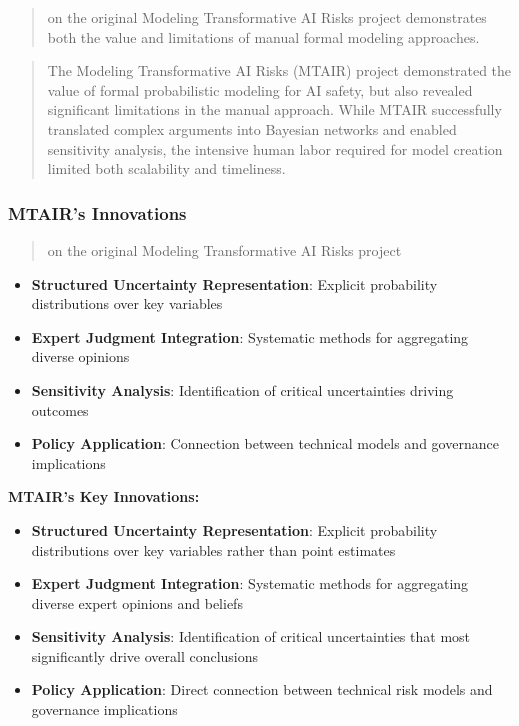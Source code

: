 \documentclass[
  11pt,
  letterpaper,
]{book}
\providecommand{\tightlist}{%
  \setlength{\itemsep}{0pt}\setlength{\parskip}{0pt}}
\begin{document}
\begin{quote}
\textcite{bucknall2022} on the original Modeling Transformative AI Risks
project demonstrates both the value and limitations of manual formal
modeling approaches.
\end{quote}

\begin{quote}
The Modeling Transformative AI Risks (MTAIR) project demonstrated the
value of formal probabilistic modeling for AI safety, but also revealed
significant limitations in the manual approach. While MTAIR successfully
translated complex arguments into Bayesian networks and enabled
sensitivity analysis, the intensive human labor required for model
creation limited both scalability and timeliness.
\end{quote}

\subsubsection{MTAIR's Innovations}\label{sec-mtair-innovations}

\begin{quote}
\textcite{bucknall2022} on the original Modeling Transformative AI Risks
project
\end{quote}

\begin{itemize}
\tightlist
\item
  \textbf{Structured Uncertainty Representation}: Explicit probability
  distributions over key variables
\item
  \textbf{Expert Judgment Integration}: Systematic methods for
  aggregating diverse opinions
\item
  \textbf{Sensitivity Analysis}: Identification of critical
  uncertainties driving outcomes
\item
  \textbf{Policy Application}: Connection between technical models and
  governance implications
\end{itemize}

\textbf{MTAIR's Key Innovations:}

\begin{itemize}
\tightlist
\item
  \textbf{Structured Uncertainty Representation}: Explicit probability
  distributions over key variables rather than point estimates
\item
  \textbf{Expert Judgment Integration}: Systematic methods for
  aggregating diverse expert opinions and beliefs
\item
  \textbf{Sensitivity Analysis}: Identification of critical
  uncertainties that most significantly drive overall conclusions
\item
  \textbf{Policy Application}: Direct connection between technical risk
  models and governance implications
\end{itemize}
\end{document}
